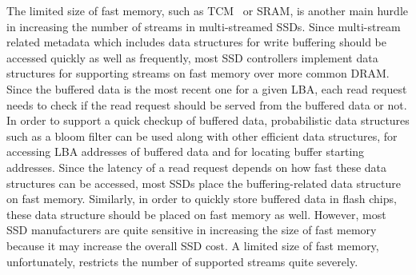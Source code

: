 The limited size of fast memory, such as TCM~\cite{TCM} or SRAM, is another main hurdle in increasing 
the number of streams in multi-streamed SSDs.
Since multi-stream related metadata which includes data structures for write buffering 
should be accessed quickly as well as frequently, 
most SSD controllers implement data structures for supporting streams on fast memory over more common DRAM. 
Since the buffered data is the 
most recent one for a given LBA, each read request needs to check if the read request 
should be served from the buffered data or not.
In order to support a quick checkup of buffered data, probabilistic data structures
such as a bloom filter can be used along with other efficient data structures, 
for accessing LBA
addresses of buffered data and for locating buffer starting addresses.   
Since the latency of a read request depends on how fast these data structures 
can be accessed, most SSDs place the
buffering-related data structure on fast memory.   
Similarly, in order to quickly store buffered data in flash chips, these data structure 
should be placed on fast memory as well.
However, most SSD manufacturers are quite sensitive in increasing the size of 
fast memory because it may increase the overall SSD cost.   
A limited size of fast memory, unfortunately, restricts the number of
supported streams quite severely.

